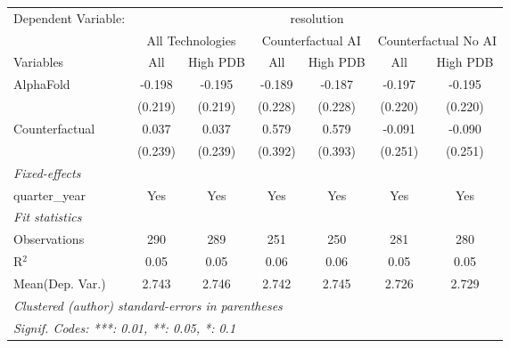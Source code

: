 \begingroup
\centering
\begin{tabular}{lcccccc}
   \tabularnewline \midrule \midrule
   Dependent Variable: & \multicolumn{6}{c}{resolution}\\
 & \multicolumn{2}{c}{All Technologies} & \multicolumn{2}{c}{Counterfactual AI} & \multicolumn{2}{c}{Counterfactual No AI} \\
\cmidrule(lr){1-1}\cmidrule(lr){2-3} \cmidrule(lr){4-5} \cmidrule(lr){6-7}
Variables & \multicolumn{1}{c}{All} & \multicolumn{1}{c}{High PDB} & \multicolumn{1}{c}{All} & \multicolumn{1}{c}{High PDB} & \multicolumn{1}{c}{All} & \multicolumn{1}{c}{High PDB} \\
\cmidrule(lr){1-1}\cmidrule(lr){2-2} \cmidrule(lr){3-3} \cmidrule(lr){4-4} \cmidrule(lr){5-5} \cmidrule(lr){6-6} \cmidrule(lr){7-7}
   AlphaFold      & -0.198  & -0.195  & -0.189  & -0.187  & -0.197  & -0.195\\   
                  & (0.219) & (0.219) & (0.228) & (0.228) & (0.220) & (0.220)\\   
   Counterfactual & 0.037   & 0.037   & 0.579   & 0.579   & -0.091  & -0.090\\   
                  & (0.239) & (0.239) & (0.392) & (0.393) & (0.251) & (0.251)\\   
   \midrule
   \emph{Fixed-effects}\\
   quarter\_year  & Yes     & Yes     & Yes     & Yes     & Yes     & Yes\\  
   \midrule
   \emph{Fit statistics}\\
   Observations   & 290     & 289     & 251     & 250     & 281     & 280\\  
   R$^2$          & 0.05    & 0.05    & 0.06    & 0.06    & 0.05    & 0.05\\  
Mean(Dep. Var.) & 2.743 & 2.746 & 2.742 & 2.745 & 2.726 & 2.729 \\
   \midrule \midrule
   \multicolumn{7}{l}{\emph{Clustered (author) standard-errors in parentheses}}\\
   \multicolumn{7}{l}{\emph{Signif. Codes: ***: 0.01, **: 0.05, *: 0.1}}\\
\end{tabular}
\par\endgroup
